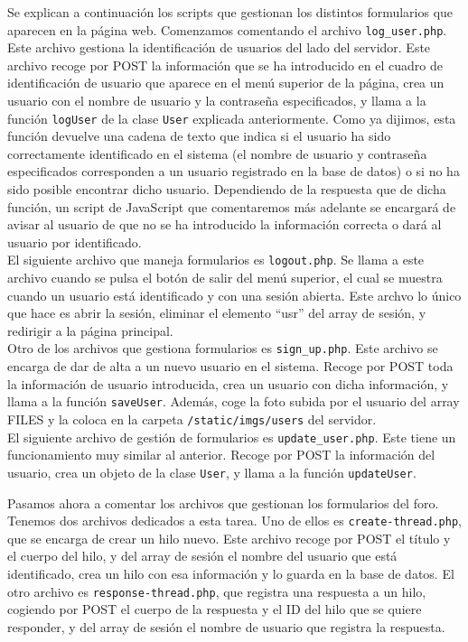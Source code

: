 \documentclass[11pt]{article}
\theoremstyle{plain}
\theoremstyle{definition}
\begin{document}
Se explican a continuación los scripts que gestionan los distintos
formularios que aparecen en la página web. Comenzamos comentando el
archivo \texttt{log\_user.php}. Este archivo gestiona la
identificación de usuarios del lado del servidor. Este archivo recoge
por POST la información que se ha introducido en el cuadro de
identificación de usuario que aparece en el menú superior de la
página, crea un usuario con el nombre de usuario y la contraseña
especificados, y llama a la función \texttt{logUser} de la clase
\texttt{User} explicada anteriormente. Como ya dijimos, esta función
devuelve una cadena de texto que indica si el usuario ha sido
correctamente identificado en el sistema (el nombre de usuario y
contraseña especificados corresponden a un usuario registrado en la
base de datos) o si no ha sido posible encontrar dicho
usuario. Dependiendo de la respuesta que de dicha función, un script
de JavaScript que comentaremos más adelante se encargará de avisar al
usuario de que no se ha introducido
la información correcta o dará al usuario por identificado.\\

El siguiente archivo que maneja formularios es \texttt{logout.php}.
Se llama a este archivo cuando se pulsa el botón de salir del menú
superior, el cual se muestra cuando un usuario está identificado y con
una sesión abierta. Este archvo lo único que hace es abrir la sesión,
eliminar el elemento ``usr'' del array de sesión, y redirigir a la
página principal.\\

Otro de los archivos que gestiona formularios es
\texttt{sign\_up.php}.  Este archivo se encarga de dar de alta a un
nuevo usuario en el sistema. Recoge por POST toda la información de
usuario introducida, crea un usuario con dicha información, y llama a
la función \texttt{saveUser}. Además, coge la foto subida por el
usuario del array FILES y la coloca en la carpeta
\texttt{/static/imgs/users}
del servidor.\\

El siguiente archivo de gestión de formularios es
\texttt{update\_user.php}. Este tiene un funcionamiento muy similar al
anterior. Recoge por POST la información del usuario, crea un objeto
de la clase \texttt{User}, y llama a la función \texttt{updateUser}.

Pasamos ahora a comentar los archivos que gestionan los formularios
del foro. Tenemos dos archivos dedicados a esta tarea. Uno de ellos es
\texttt{create-thread.php}, que se encarga de crear un hilo nuevo.
Este archivo recoge por POST el título y el cuerpo del hilo, y del
array de sesión el nombre del usuario que está identificado, crea un
hilo con esa información y lo guarda en la base de datos. El otro
archivo es \texttt{response-thread.php}, que registra una respuesta a
un hilo, cogiendo por POST el cuerpo de la respuesta y el ID del hilo
que se quiere responder, y del array de sesión el nombre de usuario
que registra la respuesta.
\end{document}
